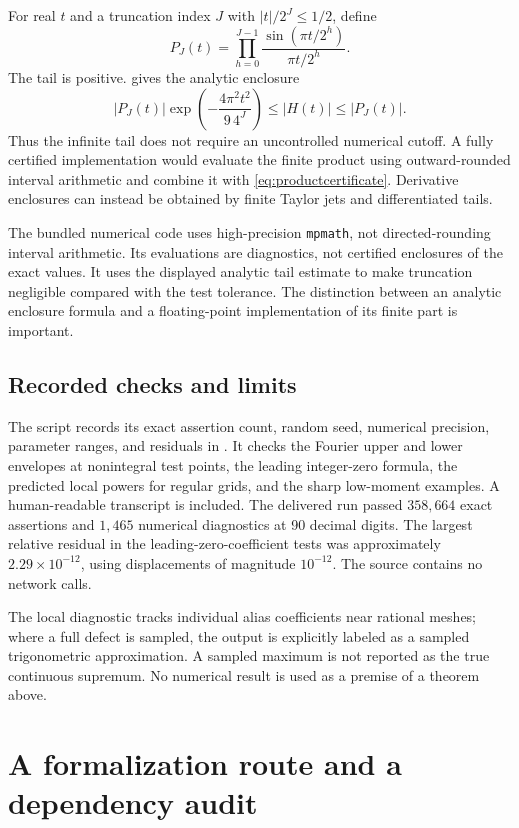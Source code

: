 \documentclass[11pt,a4paper]{article}
\numberwithin{equation}{section}
\theoremstyle{plain}
\theoremstyle{definition}
\theoremstyle{remark}
\begin{document}
For real $t$ and a truncation index $J$ with $|t|/2^J\le1/2$, define
\[
 P_J(t)=\prod_{h=0}^{J-1}\frac{\sin(\pi t/2^h)}{\pi t/2^h}.
\]
The tail is positive.  gives the analytic enclosure
\begin{equation}\label{eq:productcertificate}
 |P_J(t)|\exp\!\left(-\frac{4\pi^2t^2}{9\,4^J}\right)
 \le |H(t)|\le |P_J(t)|.
\end{equation}
Thus the infinite tail does not require an uncontrolled numerical cutoff.
A fully certified implementation would evaluate the finite product using
outward-rounded interval arithmetic and combine it with
\eqref{eq:productcertificate}. Derivative enclosures can instead be obtained
by finite Taylor jets and differentiated tails.

The bundled numerical code uses high-precision \texttt{mpmath}, not
directed-rounding interval arithmetic. Its evaluations are diagnostics, not
certified enclosures of the exact values. It uses the displayed analytic
tail estimate to make truncation negligible compared with the test tolerance.
The distinction between an analytic enclosure formula and a floating-point
implementation of its finite part is important.

\subsection{Recorded checks and limits}

The script records its exact assertion count, random seed, numerical precision,
parameter ranges, and residuals in .
It checks the Fourier upper and lower envelopes at nonintegral test points,
the leading integer-zero formula, the predicted local powers for regular
grids, and the sharp low-moment examples. A human-readable transcript is
included. The delivered run passed $358{,}664$ exact assertions and $1{,}465$
numerical diagnostics at 90 decimal digits. The largest relative residual in
the leading-zero-coefficient tests was approximately $2.29\times10^{-12}$,
using displacements of magnitude $10^{-12}$. The source contains no network
calls.

The local diagnostic tracks individual alias coefficients near rational
meshes; where a full defect is sampled, the output is explicitly labeled as
a sampled trigonometric approximation. A sampled maximum is not reported as
the true continuous supremum. No numerical result is used as a premise of a
theorem above.

\section{A formalization route and a dependency audit}
\label{sec:formal}
\end{document}
